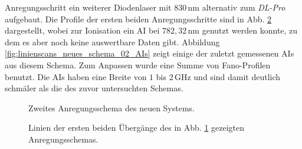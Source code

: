 Anregungsschritt ein weiterer Diodenlaser mit $830\,$nm alternativ zum
\textit{DL-Pro} aufgebaut. Die Profile der ersten beiden
Anregungsschritte sind in Abb. \ref{fig:linienscans_neues_schema_02}
dargestellt, wobei zur Ionisation ein AI bei $782,32\,$nm genutzt werden konnte,
zu dem es aber noch keine auswertbare Daten gibt. Abbildung
\ref{fig:linienscans_neues_schema_02_AIs} zeigt einige der zuletzt gemessenen
AIs aus diesem Schema. Zum Anpassen wurde eine Summe von Fano-Profilen benutzt.
Die AIs haben eine Breite von $1$ bis $2\,$GHz und sind damit deutlich schmäler
als die des zuvor untersuchten Schemas.
\begin{figure}[h]
 	\centering
	\caption[Anregungsschema, neu (1)]{Zweites Anregungsschema des neuen
	Systems.}
	\label{fig:anregungsschema_neu_02}
\end{figure}
\begin{figure}[hp]
 	\centering
 	\footnotesize
	\caption[erster und zweiter Anregungsschritt, neues System, Schema (2)]{Linien
	der ersten beiden Übergänge des in Abb. \ref{fig:anregungsschema_neu_02}
	gezeigten Anregungsschemas.}
	\label{fig:linienscans_neues_schema_02}
\end{figure}

